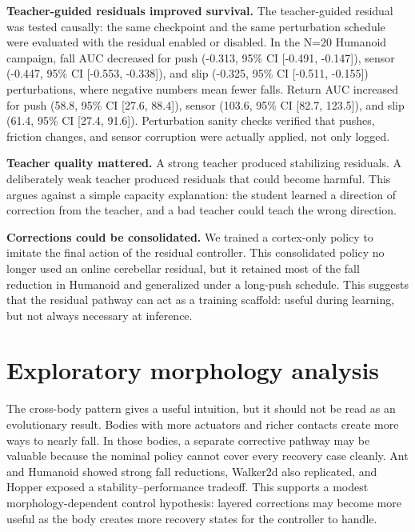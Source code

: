 \documentclass[11pt]{article}
\begin{document}
\textbf{Teacher-guided residuals improved survival.}  The teacher-guided residual was tested causally: the same checkpoint and the same perturbation schedule were evaluated with the residual enabled or disabled.  In the N=20 Humanoid campaign, fall AUC decreased for push (-0.313, 95\% CI [-0.491, -0.147]), sensor (-0.447, 95\% CI [-0.553, -0.338]), and slip (-0.325, 95\% CI [-0.511, -0.155]) perturbations, where negative numbers mean fewer falls.  Return AUC increased for push (58.8, 95\% CI [27.6, 88.4]), sensor (103.6, 95\% CI [82.7, 123.5]), and slip (61.4, 95\% CI [27.4, 91.6]).  Perturbation sanity checks verified that pushes, friction changes, and sensor corruption were actually applied, not only logged.

\textbf{Teacher quality mattered.}  A strong teacher produced stabilizing residuals.  A deliberately weak teacher produced residuals that could become harmful.  This argues against a simple capacity explanation: the student learned a direction of correction from the teacher, and a bad teacher could teach the wrong direction.

\textbf{Corrections could be consolidated.}  We trained a cortex-only policy to imitate the final action of the residual controller.  This consolidated policy no longer used an online cerebellar residual, but it retained most of the fall reduction in Humanoid and generalized under a long-push schedule.  This suggests that the residual pathway can act as a training scaffold: useful during learning, but not always necessary at inference.

\section*{Exploratory morphology analysis}
The cross-body pattern gives a useful intuition, but it should not be read as an evolutionary result.  Bodies with more actuators and richer contacts create more ways to nearly fall.  In those bodies, a separate corrective pathway may be valuable because the nominal policy cannot cover every recovery case cleanly.  Ant and Humanoid showed strong fall reductions, Walker2d also replicated, and Hopper exposed a stability--performance tradeoff.  This supports a modest morphology-dependent control hypothesis: layered corrections may become more useful as the body creates more recovery states for the controller to handle.
\end{document}
